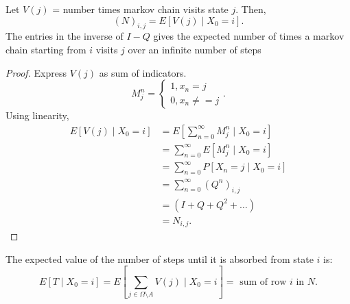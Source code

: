 \documentclass[a4paper]{article}
\begin{document}
\begin{prop}
  Let $V(j)$ = number times markov chain visits state  $j$. Then,
   \[
     (N)_{i,j} = E[V(j) \mid  X_0 = i]
  .\] 
  The entries in the inverse of $I-Q$ gives the expected number of times a markov chain starting from $i$ visits  $j$ over an infinite number of steps
  \begin{proof}
    Express $V(j)$ as sum of indicators.
     \[
    M_j^{n} = \begin{cases}
      1, x_n =j \\
      0, x_n \neq =j
    \end{cases}
    .\]
    Using linearity,
    \begin{align*}
      E[V(j) \mid  X_0 = i] &= E[\sum_{n=0}^{\infty} M_j^{n} \mid X_0 =i] \\
                            &= \sum_{n=0}^{\infty} E[M_j^{n}\mid X_0=i]  \\
                            &= \sum_{n=0}^{\infty}  P[X_n = j \mid  X_0 = i] \\
                            &= \sum_{n=0}^{\infty} (Q^{n})_{i,j} \\
                            &= (I + Q + Q^{2} + \ldots) \\
                            &= N_{i,j}
    .\end{align*}
  \end{proof}
\end{prop}

\begin{theorem}
  The expected value of the number of steps until it is absorbed from state $i$ is:
   \[
     E[T \mid  X_0 = i] = E[\sum_{j \in \Omega \setminus A} V(j) \mid  X_0 = i] = \text{ sum of row $i$ in  $N$} 
  .\] 
\end{theorem}
\end{document}

